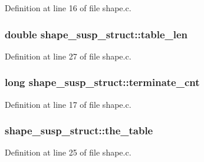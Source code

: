 Definition at line 16 of file shape.\+c.

\subsubsection[{\texorpdfstring{table\+\_\+len}{table_len}}]{\setlength{\rightskip}{0pt plus 5cm}double shape\+\_\+susp\+\_\+struct\+::table\+\_\+len}\hypertarget{structshape__susp__struct_a712056b16316039c349422df53d058d4}{}\label{structshape__susp__struct_a712056b16316039c349422df53d058d4}


Definition at line 27 of file shape.\+c.

\subsubsection[{\texorpdfstring{terminate\+\_\+cnt}{terminate_cnt}}]{\setlength{\rightskip}{0pt plus 5cm}long shape\+\_\+susp\+\_\+struct\+::terminate\+\_\+cnt}\hypertarget{structshape__susp__struct_a6137ae5fc7270ea3d91dff546b609e02}{}\label{structshape__susp__struct_a6137ae5fc7270ea3d91dff546b609e02}


Definition at line 17 of file shape.\+c.

\subsubsection[{\texorpdfstring{the\+\_\+table}{the_table}}]{ shape\+\_\+susp\+\_\+struct\+::the\+\_\+table}\hypertarget{structshape__susp__struct_a95960a4f8f9fe405db8a924bb0611465}{}\label{structshape__susp__struct_a95960a4f8f9fe405db8a924bb0611465}


Definition at line 25 of file shape.\+c.

